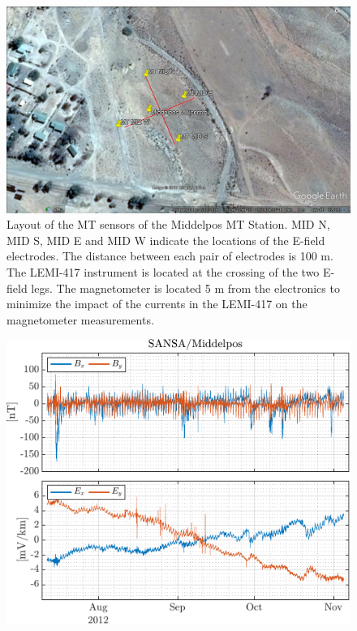 \documentclass[draft,linenumbers]{agujournal2018}
\begin{document}
\begin{figure}[h]
  \centering
  \includegraphics[width=\textwidth]{figures/site.png}
  \caption{Layout of the MT sensors of the Middelpos MT Station. MID N, MID S, MID E and MID W indicate the locations of the E-field electrodes. The distance between each pair of electrodes is 100 m. The LEMI-417 instrument is located at the crossing of the two E-field legs. The magnetometer is located 5 m from the electronics to minimize the impact of the currents in the LEMI-417 on the magnetometer measurements. 
}
 \label{fig:site}
\end{figure}

\begin{figure}[h]
  \centering
  \includegraphics[width=\textwidth]{figures/tsplot-original-Middelpos-tf1.pdf}
  \caption{}
  \label{fig:timeseries}
\end{figure}
\end{document}
